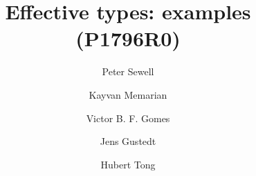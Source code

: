 \documentclass[12pt,acmsmall,review,screen]{acmart}\settopmatter{printfolios=true,printccs=false,printacmref=false}
\newif\ifWGfourteennumber
\begin{document}
\ifWGfourteennumber
\fancypagestyle{firstpagestyle}{%
\fancyhf{} %
\fancyhead[C]{ISO/IEC JTC1/SC22/WG14 N2311, 2018-11-09} %
\renewcommand{\headrulewidth}{0pt}
\renewcommand{\footrulewidth}{0pt}}
\thispagestyle{plain}
\fi

\title[Effective types: examples (P1796R0)]{Effective types: examples (P1796R0)}


\authorsaddresses{}

\author{Peter Sewell}

 \author{Kayvan Memarian}
% 
% 
 \author{Victor B. F. Gomes}

\author{Jens Gustedt}

\author{Hubert Tong}



\end{document}
